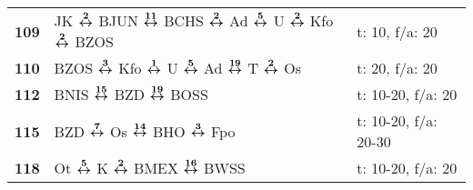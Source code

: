 \begin{minipage}[t]{0.45\textwidth}
\begin{tabular}{>{\bfseries}L{1.2cm}L{9.0cm}L{3.0cm}}
\bus{} 109    & JK $\xarwe{2}$ BJUN $\xarwe{11}$ BCHS $\xarwe{2}$ Ad $\xarwe{5}$ U $\xarwe{2}$ Kfo $\xarwe{2}$ BZOS                                                 & t: 10, f/a: 20             \\
\bus{} 110    & BZOS $\xarwe{3}$ Kfo $\xarwe{1}$ U $\xarwe{5}$ Ad $\xarwe{19}$ T $\xarwe{2}$ Os                                                                                     & t: 20, f/a: 20             \\
\bus{} 112    & BNIS $\xarwe{15}$ BZD $\xarwe{19}$ BOSS                                                                                                                             & t: 10-20, f/a: 20          \\
\bus{} 115    & BZD $\xarwe{7}$ Os $\xarwe{14}$ BHO $\xarwe{3}$ Fpo                                                                                                                 & t: 10-20, f/a: 20-30       \\
\bus{} 118    & Ot $\xarwe{5}$ K $\xarwe{2}$ BMEX $\xarwe{16}$ BWSS
& t: 10-20, f/a: 20          \\
\hline
\end{tabular}
\end{minipage}
\begin{minipage}[t]{0.05\textwidth}
\phantom{Tor}
\end{minipage}

